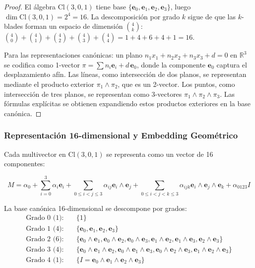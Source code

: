 \begin{proof}
El álgebra $\text{Cl}(3,0,1)$ tiene base $\{\mathbf{e}_0, \mathbf{e}_1, \mathbf{e}_2, \mathbf{e}_3\}$, luego $\dim \text{Cl}(3,0,1) = 2^4 = 16$. La descomposición por grado $k$ sigue de que las $k$-blades forman un espacio de dimensión $\binom{4}{k}$: $\binom{4}{0} + \binom{4}{1} + \binom{4}{2} + \binom{4}{3} + \binom{4}{4} = 1 + 4 + 6 + 4 + 1 = 16$.

Para las representaciones canónicas: un plano $n_1 x_1 + n_2 x_2 + n_3 x_3 + d = 0$ en $\mathbb{R}^3$ se codifica como 1-vector $\pi = \sum n_i \mathbf{e}_i + d\,\mathbf{e}_0$, donde la componente $\mathbf{e}_0$ captura el desplazamiento afín. Las líneas, como intersección de dos planos, se representan mediante el producto exterior $\pi_1 \wedge \pi_2$, que es un 2-vector. Los puntos, como intersección de tres planos, se representan como 3-vectores $\pi_1 \wedge \pi_2 \wedge \pi_3$. Las fórmulas explícitas se obtienen expandiendo estos productos exteriores en la base canónica.
\end{proof}

\subsubsection{Representación 16-dimensional y Embedding Geométrico}

\begin{definition}\label{def:espacio_representacion_gatr}
Cada multivector en $\text{Cl}(3,0,1)$ se representa como un vector de 16 componentes:

\begin{equation}
    M = \alpha_0 + \sum_{i=0}^{3} \alpha_i \mathbf{e}_i + \sum_{0 \leq i < j \leq 3} \alpha_{ij} \mathbf{e}_i \wedge \mathbf{e}_j + \sum_{0 \leq i < j < k \leq 3} \alpha_{ijk} \mathbf{e}_i \wedge \mathbf{e}_j \wedge \mathbf{e}_k + \alpha_{0123} I
    \label{eq:gatr_multivector}
\end{equation}

La base canónica 16-dimensional se descompone por grados:
\begin{align}
\text{Grado 0 (1):} \quad & \{1\} \\
\text{Grado 1 (4):} \quad & \{\mathbf{e}_0, \mathbf{e}_1, \mathbf{e}_2, \mathbf{e}_3\} \\
\text{Grado 2 (6):} \quad & \{\mathbf{e}_0 \wedge \mathbf{e}_1, \mathbf{e}_0 \wedge \mathbf{e}_2, \mathbf{e}_0 \wedge \mathbf{e}_3, \mathbf{e}_1 \wedge \mathbf{e}_2, \mathbf{e}_1 \wedge \mathbf{e}_3, \mathbf{e}_2 \wedge \mathbf{e}_3\} \\
\text{Grado 3 (4):} \quad & \{\mathbf{e}_0 \wedge \mathbf{e}_1 \wedge \mathbf{e}_2, \mathbf{e}_0 \wedge \mathbf{e}_1 \wedge \mathbf{e}_3, \mathbf{e}_0 \wedge \mathbf{e}_2 \wedge \mathbf{e}_3, \mathbf{e}_1 \wedge \mathbf{e}_2 \wedge \mathbf{e}_3\} \\
\text{Grado 4 (1):} \quad & \{I = \mathbf{e}_0 \wedge \mathbf{e}_1 \wedge \mathbf{e}_2 \wedge \mathbf{e}_3\}
\end{align}
\end{definition}


